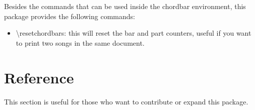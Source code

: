 \documentclass[11pt]{article}
\begin{document}
Besides the commands that can be used inside the chordbar environment, this package provides the following commands:

\begin{itemize}
\item {\ttfamily \textbackslash resetchordbars}: this will reset the bar and part counters, useful if you want to print two songs in the same document.
\end{itemize}


\section{Reference}

This section is useful for those who want to contribute or expand this package.
\end{document}
